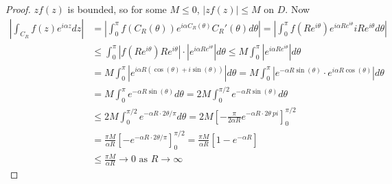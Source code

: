 \begin{proof}
	$z f(z)$ is bounded, so for some $M \le 0$, $|z f(z)| \le M$ on $D$. Now
	\[
		\begin{aligned}
			\left| \int_{C_R} f(z) e^{i \alpha z} dz \right| & = \left| \int_{0}^{\pi} f(C_R(\theta)) e^{i \alpha C_R(\theta)} C_R'(\theta) d\theta \right| = \left| \int_{0}^{\pi} f(R e^{i\theta}) e^{i \alpha R e^{i\theta}} i R e^{i\theta} d\theta \right| \\
			& \le \int_{0}^{\pi} \left| f(R e^{i\theta}) R e^{i\theta} \right| \cdot |e^{i \alpha R e^{i\theta}}| d\theta \le M \int_{0}^{\pi} |e^{i \alpha R e^{i\theta}}| d\theta \\
			& = M \int_{0}^{\pi} \left| e^{i \alpha R (\cos(\theta) + i \sin(\theta))} \right| d\theta = M \int_{0}^{\pi} \left| e^{-\alpha R \sin(\theta)} \cdot e^{i \alpha R \cos(\theta)} \right| d\theta \\
			& = M \int_{0}^{\pi} e^{- \alpha R \sin(\theta)} d\theta = 2M \int_{0}^{\pi / 2} e^{- \alpha R \sin(\theta)} d\theta \\
			& \le 2M \int_{0}^{\pi / 2} e^{-\alpha R \cdot 2 \theta / \pi} d\theta = 2M \left[ -\frac{\pi}{2\alpha R} e^{-\alpha R \cdot 2 \theta \ pi} \right]_0^{\pi / 2} \\
			& = \frac{\pi M}{\alpha R} \left[ -e^{-\alpha R \cdot 2\theta / \pi} \right]_0^{\pi / 2} = \frac{\pi M}{\alpha R} \left[ 1 - e^{-\alpha R} \right] \\
			& \le \frac{\pi M}{\alpha R} \to 0 \text{ as } R \to \infty
		\end{aligned}
	\]
\end{proof}

